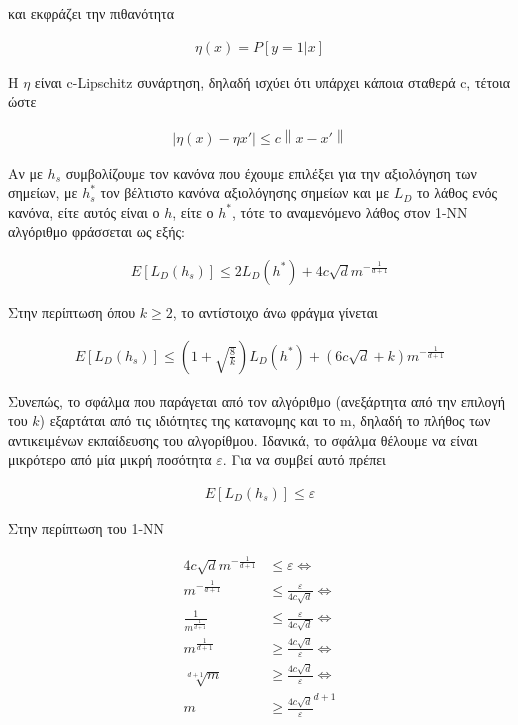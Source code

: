 \documentclass[12pt]{article}
\newcommand{\norm}[1]{\left\lVert#1\right\rVert}
\begin{document}
και εκφράζει την πιθανότητα 

\begin{align*}
	η(x) = P[y = 1 | x]
\end{align*}

Η \(η\) είναι c-Lipschitz συνάρτηση, δηλαδή ισχύει ότι υπάρχει κάποια σταθερά c, τέτοια ώστε

\begin{align*}
	|η(x) - η{x'}| \leq c \norm{x-x'}
\end{align*}  

Αν με \(h_s\) συμβολίζουμε τον κανόνα που έχουμε επιλέξει για την αξιολόγηση των σημείων, με \(h_{s}^*\) τον βέλτιστο κανόνα αξιολόγησης σημείων και με \(L_D\) το λάθος ενός κανόνα, είτε αυτός είναι ο \(h\), είτε ο \(h^*\), τότε το αναμενόμενο λάθος στον 1-NN αλγόριθμο φράσσεται ως εξής:

\begin{align*}
	E[L_D(h_s)] \leq 2 L_D(h^*) + 4c \sqrt{d} m^{- \frac{1}{d+1}}
\end{align*} 

Στην περίπτωση όπου \(k \geq 2\), το αντίστοιχο άνω φράγμα γίνεται 

\begin{align*}
	E[L_D(h_s)] \leq (1 + \sqrt{\frac{8}{k}}) L_D(h^*) + (6c \sqrt{d} + k) m^{- \frac{1}{d+1}}
\end{align*} 

Συνεπώς, το σφάλμα που παράγεται από τον αλγόριθμο (ανεξάρτητα από την επιλογή του \(k\)) εξαρτάται από τις ιδιότητες της κατανομης και το m, δηλαδή το πλήθος των αντικειμένων εκπαίδευσης του αλγορίθμου. Ιδανικά, το σφάλμα θέλουμε να είναι μικρότερο από μία μικρή ποσότητα \(ε\). Για να συμβεί αυτό πρέπει

\begin{align*}
	E[L_D(h_s)] \leq ε
\end{align*}

Στην περίπτωση του 1-ΝΝ

\begin{align*}
	4c \sqrt{d} m^{- \frac{1}{d+1}} &\leq ε \Leftrightarrow \\
	m^{- \frac{1}{d+1}} &\leq \frac{ε}{4c \sqrt{d}} \Leftrightarrow \\
	\frac{1}{m^{\frac{1}{d+1}}} &\leq \frac{ε}{4c \sqrt{d}} \Leftrightarrow \\
	m^{\frac{1}{d+1}} &\geq \frac{4c \sqrt{d} }{ε}\Leftrightarrow \\
	\sqrt[d+1]{m} &\geq \frac{4c \sqrt{d} }{ε} \Leftrightarrow \\
	m &\geq \frac{4c \sqrt{d}}{ε}^{d+1} 
\end{align*}
\end{document}
